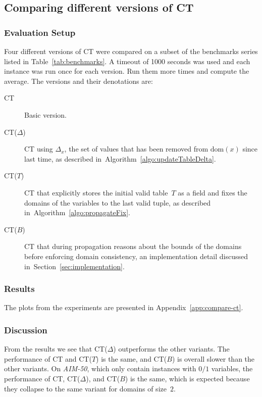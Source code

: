 \documentclass[a4paper,11pt]{article}
\newcommand{\Todo}[1]{{\color{blue}#1}}
\newcommand{\Secref}[1]{Section~\ref{#1}}
\newcommand{\Algoref}[1]{Algorithm~\ref{#1}}
\newcommand{\Dom}[1]{\text{dom}({#1})}
\numberwithin{equation}{section}
\begin{document}



\subsection{Comparing different versions of CT}
\label{sec:compare}

\subsubsection{Evaluation Setup}
Four different versions of CT were compared on a subset of the benchmarks
series listed in Table~\ref{tab:benchmarks}. A timeout of 1000 seconds was
used and each instance was run once for each version.
\Todo{Run them more times and compute the average.}
The versions and their denotations are:

\begin{description}
  \item[CT] Basic version.
  \item[CT($\Delta$)] CT using $\Delta_x$, the set
    of values that has been removed from $\Dom{x}$
    since last time, as described in~\Algoref{algo:updateTableDelta}.
  \item[CT($T$)] CT that explicitly stores the initial valid table~$T$ as
    a field and
    fixes the domains of the variables to the last valid tuple, as described
    in~\Algoref{algo:propagateFix}.
  \item[CT($B$)] CT that during propagation reasons about the bounds of the domains before
    enforcing domain consistency, an implementation detail discussed in~\Secref{sec:implementation}.
\end{description}

\subsubsection{Results}

The plots from the experiments are presented in Appendix~\ref{app:compare-ct}.

\subsubsection{Discussion}
From the results we see that CT($\Delta$) outperforms the other variants.
The performance of CT and CT($T$) is the same, and CT($B$) is overall
slower than the other variants. On \emph{AIM-50}, which only contain instances
with $0/1$ variables, the performance of CT, CT($\Delta$), and CT($B$) is
the same, which is expected because they collapse to the same variant
for domains of size~$2$.
\end{document}

